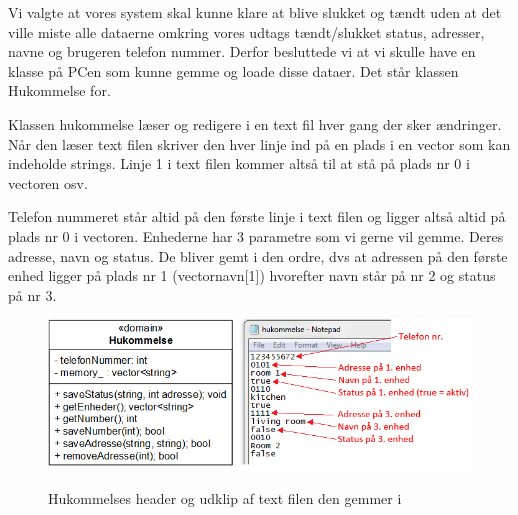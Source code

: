 Vi valgte at vores system skal kunne klare at blive slukket og tændt uden at det ville miste alle dataerne omkring vores udtags tændt/slukket status, adresser, navne og brugeren telefon nummer. Derfor besluttede vi at vi skulle have en klasse på PCen som kunne gemme og loade disse dataer. Det står klassen Hukommelse for.
\medskip

Klassen hukommelse læser og redigere i en text fil hver gang der sker ændringer. Når den læser text filen skriver den hver linje ind på en plads i en vector som kan indeholde strings. Linje 1 i text filen kommer altså til at stå på plads nr 0 i vectoren osv.

\medskip
Telefon nummeret står altid på den første linje i text filen og ligger altså altid på plads nr 0 i vectoren. Enhederne har 3 parametre som vi gerne vil gemme. Deres adresse, navn og status. De bliver gemt i den ordre, dvs at adressen på den første enhed ligger på plads nr 1 (vectornavn[1]) hvorefter navn står på nr 2 og status på nr 3.\\

\begin{figure}[!htb]
     {\includegraphics[width=\textwidth]{billeder/uml/PC_dataview}}
     \caption{Hukommelses header og udklip af text filen den gemmer i}
     \label{fig:PC_Class}
\end{figure}